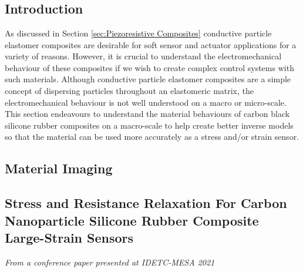 \chapter{\chapiiiname}
\label{chapter3}

\section{Introduction}
As discussed in Section \ref{sec:Piezoresistive Composites} conductive particle elastomer composites are desirable for soft sensor and actuator applications for a variety of reasons. However, it is crucial to understand the electromechanical behaviour of these composites if we wish to create complex control systems with such materials. Although conductive particle elastomer composites are a simple concept of dispersing particles throughout an elastomeric matrix, the electromechanical behaviour is not well understood on a macro or micro-scale. This section endeavours to understand the material behaviours of carbon black silicone rubber composites on a macro-scale to help create better inverse models so that the material can be used more accurately as a stress and/or strain sensor. 



\section{Material Imaging}



\section{Stress and Resistance Relaxation For Carbon Nanoparticle Silicone Rubber Composite Large-Strain Sensors}
\label{sec:Stress and Resistance Relaxation}
\textit{From a conference paper presented at IDETC-MESA 2021}

